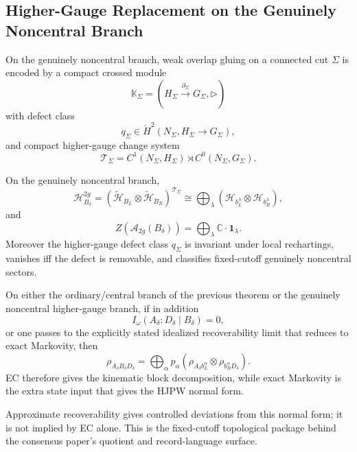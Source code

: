 \subsection{Higher-Gauge Replacement on the Genuinely Noncentral Branch}

\begin{proposition}
On the genuinely noncentral branch, weak overlap gluing on a connected cut \(\Sigma\) is encoded
by a compact crossed module
\[
\mathbb K_\Sigma=(H_\Sigma\xrightarrow{\partial_\Sigma}G_\Sigma,\triangleright)
\]
with defect class
\[
q_\Sigma\in \check H^2(N_\Sigma,H_\Sigma\to G_\Sigma),
\]
and compact higher-gauge change system
\[
\mathcal T_\Sigma=C^1(N_\Sigma,H_\Sigma)\rtimes C^0(N_\Sigma,G_\Sigma).
\]
\end{proposition}

\begin{theorem}
On the genuinely noncentral branch,
\[
\mathcal H_{B_\delta}^{2g}
=
(\tilde{\mathcal H}_{B_L}\otimes \tilde{\mathcal H}_{B_R})^{\mathcal T_\Sigma}
\cong
\bigoplus_\lambda
(\mathcal H_{b_L^\lambda}\otimes \mathcal H_{b_R^\lambda}),
\]
and
\[
Z(\mathcal A_{2g}(B_\delta))
=
\bigoplus_\lambda \mathbb C\cdot \mathbf 1_\lambda.
\]
Moreover the higher-gauge defect class \(q_\Sigma\) is invariant under local rechartings, vanishes
iff the defect is removable, and classifies fixed-cutoff genuinely noncentral sectors.
\end{theorem}

\begin{corollary}
On either the ordinary/central branch of the previous theorem or the genuinely noncentral
higher-gauge branch, if in addition
\[
I_\omega(A_\delta:D_\delta\mid B_\delta)=0,
\]
or one passes to the explicitly stated idealized recoverability limit that reduces to exact
Markovity, then
\[
\rho_{A_\delta B_\delta D_\delta}
=
\bigoplus_\alpha p_\alpha
\left(\rho_{A_\delta b_L^\alpha}\otimes \rho_{b_R^\alpha D_\delta}\right).
\]
EC therefore gives the kinematic block decomposition, while exact Markovity is the extra state
input that gives the HJPW normal form.
\end{corollary}

\begin{remark}
Approximate recoverability gives controlled deviations from this normal form; it is not implied by
EC alone. This is the fixed-cutoff topological package behind the consensus paper's quotient and
record-language surface.
\end{remark}
